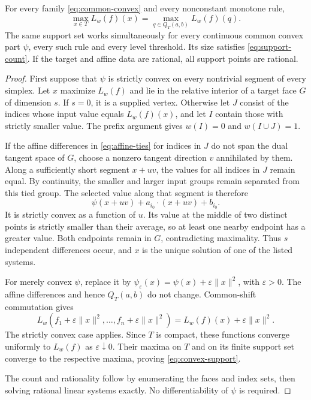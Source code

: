 \begin{theorem}\label{thm:convex-support}
For every family \cref{eq:common-convex} and every nonconstant monotone rule,
\begin{equation}\label{eq:convex-support}
\max_{x\in T}L_w(f)(x)=\max_{q\in Q_T(a,b)}L_w(f)(q).
\end{equation}
The same support set works simultaneously for every continuous common convex part $\psi$, every such rule and every level threshold. Its size satisfies \cref{eq:support-count}. If the target and affine data are rational, all support points are rational.
\end{theorem}
\begin{proof}
First suppose that $\psi$ is strictly convex on every nontrivial segment of every simplex. Let $x$ maximize $L_w(f)$ and lie in the relative interior of a target face $G$ of dimension $s$. If $s=0$, it is a supplied vertex. Otherwise let $J$ consist of the indices whose input value equals $L_w(f)(x)$, and let $I$ contain those with strictly smaller value. The prefix argument gives $w(I)=0$ and $w(I\cup J)=1$.

If the affine differences in \cref{eq:affine-ties} for indices in $J$ do not span the dual tangent space of $G$, choose a nonzero tangent direction $v$ annihilated by them. Along a sufficiently short segment $x+uv$, the values for all indices in $J$ remain equal. By continuity, the smaller and larger input groups remain separated from this tied group. The selected value along that segment is therefore
\[
\psi(x+uv)+a_{i_0}\cdot(x+uv)+b_{i_0}.
\]
It is strictly convex as a function of $u$. Its value at the middle of two distinct points is strictly smaller than their average, so at least one nearby endpoint has a greater value. Both endpoints remain in $G$, contradicting maximality. Thus $s$ independent differences occur, and $x$ is the unique solution of one of the listed systems.

For merely convex $\psi$, replace it by $\psi_\varepsilon(x)=\psi(x)+\varepsilon\|x\|^2$, with $\varepsilon>0$. The affine differences and hence $Q_T(a,b)$ do not change. Common-shift commutation gives
\[
L_w(f_1+\varepsilon\|x\|^2,\ldots,f_n+\varepsilon\|x\|^2)
=L_w(f)(x)+\varepsilon\|x\|^2.
\]
The strictly convex case applies. Since $T$ is compact, these functions converge uniformly to $L_w(f)$ as $\varepsilon\downarrow0$. Their maxima on $T$ and on its finite support set converge to the respective maxima, proving \cref{eq:convex-support}.

The count and rationality follow by enumerating the faces and index sets, then solving rational linear systems exactly. No differentiability of $\psi$ is required.
\end{proof}

